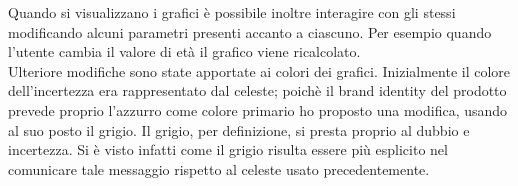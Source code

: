 Quando si visualizzano i grafici è possibile inoltre interagire con gli stessi modificando alcuni parametri presenti accanto a ciascuno. Per esempio quando l'utente cambia il valore di età il grafico viene ricalcolato. \\

Ulteriore modifiche sono state apportate ai colori dei grafici. Inizialmente il colore dell'incertezza era rappresentato dal celeste; poichè il brand identity del prodotto prevede proprio l'azzurro come colore primario ho proposto una modifica, usando al suo posto il grigio. Il grigio, per definizione, si presta proprio al dubbio e incertezza. Si è visto infatti come il grigio risulta essere più esplicito nel comunicare tale messaggio rispetto al celeste usato precedentemente. \\
